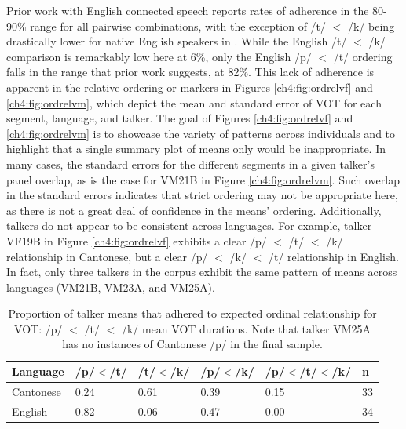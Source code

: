 Prior work with English connected speech reports rates of adherence in the 80-90\% range for all pairwise combinations, with the exception of /t/ $<$ /k/ being drastically lower for native English speakers in \citet{chodroff_2019_l2}. While the English /t/ $<$ /k/ comparison is remarkably low here at 6\%, only the English /p/ $<$ /t/ ordering falls in the range that prior work suggests, at 82\%. This lack of adherence is apparent in the relative ordering or markers in Figures \ref{ch4:fig:ordrelvf} and \ref{ch4:fig:ordrelvm}, which depict the mean and standard error of VOT for each segment, language, and talker. The goal of Figures \ref{ch4:fig:ordrelvf} and \ref{ch4:fig:ordrelvm} is to showcase the variety of patterns across individuals and to highlight that a single summary plot of means only would be inappropriate. In many cases, the standard errors for the different segments in a given talker's panel overlap, as is the case for VM21B in Figure \ref{ch4:fig:ordrelvm}. Such overlap in the standard errors indicates that strict ordering may not be appropriate here, as there is not a great deal of confidence in the means' ordering. Additionally, talkers do not appear to be consistent across languages. For example, talker VF19B in Figure \ref{ch4:fig:ordrelvf} exhibits a clear /p/ $<$ /t/ $<$ /k/ relationship in Cantonese, but a clear /p/ $<$ /k/ $<$ /t/ relationship in English. In fact, only three talkers in the corpus exhibit the same pattern of means across languages (VM21B, VM23A, and VM25A).

\begin{table}[hb!]
\caption{Proportion of talker means that adhered to expected ordinal relationship for VOT: /p/ $<$ /t/ $<$ /k/ mean VOT durations. Note that talker VM25A has no instances of Cantonese /p/ in the final sample.}
  \label{tab:ordrel}
  \centering
  {\small
  \begin{tabular}{llllll}
    \toprule
    \textbf{Language} & \textbf{/p/$<$/t/} & \textbf{/t/$<$/k/} & \textbf{/p/$<$/k/} & \textbf{/p/$<$/t/$<$/k/} &  \textbf{n} \\
    \midrule 
    Cantonese   & 0.24  & 0.61  & 0.39  &  0.15 & 33 \\
    English     & 0.82  & 0.06  & 0.47  &  0.00  & 34 \\
    \bottomrule
  \end{tabular}
  }
\end{table}

